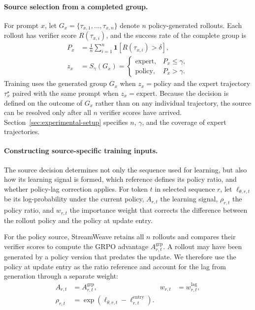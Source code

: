 \documentclass[letterpaper]{article}
\begin{document}
\paragraph{Source selection from a completed group.}
For prompt $x$, let
$G_x=\{\tau_{x,1},\ldots,\tau_{x,n}\}$
denote $n$ policy-generated rollouts.
Each rollout has verifier score $R(\tau_{x,i})$, and the success rate of the complete group is
\begin{equation}
\begin{aligned}
P_x &=
\frac{1}{n}\sum_{i=1}^{n}
\mathbf{1}\!\left[R(\tau_{x,i})>\delta\right],\\
z_x &= S_\gamma(G_x)=
\begin{cases}
\mathrm{expert}, & P_x\le\gamma,\\
\mathrm{policy}, & P_x>\gamma.
\end{cases}
\end{aligned}
\label{eq:source-selection}
\end{equation}
Training uses the generated group $G_x$ when $z_x=\mathrm{policy}$ and the expert trajectory $\tau_x^\star$ paired with the same prompt when $z_x=\mathrm{expert}$.
Because the decision is defined on the outcome of $G_x$ rather than on any individual trajectory, the source can be resolved only after all $n$ verifier scores have arrived.
Section~\ref{sec:experimental-setup} specifies $n$, $\gamma$, and the coverage of expert trajectories.

\paragraph{Constructing source-specific training inputs.}
The source decision determines not only the sequence used for learning, but also how its learning signal is formed, which reference defines its policy ratio, and whether policy-lag correction applies.
For token $t$ in selected sequence $r$, let $\ell_{\theta,r,t}$ be its log-probability under the current policy, $A_{r,t}$ the learning signal, $\rho_{r,t}$ the policy ratio, and $w_{r,t}$ the importance weight that corrects the difference between the rollout policy and the policy at update entry.

For the policy source, StreamWeave retains all $n$ rollouts and compares their verifier scores to compute the GRPO advantage $A^{\mathrm{grp}}_{r,t}$.
A rollout may have been generated by a policy version that predates the update.
We therefore use the policy at update entry as the ratio reference and account for the lag from generation through a separate weight:
\begin{equation}
\begin{aligned}
A_{r,t} &= A^{\mathrm{grp}}_{r,t},
& w_{r,t} &= w^{\mathrm{lag}}_{r,t},\\
\rho_{r,t}
&= \exp\!\left(
\ell_{\theta,r,t}-\ell^{\mathrm{entry}}_{r,t}
\right).
\end{aligned}
\label{eq:policy-input}
\end{equation}
\end{document}

